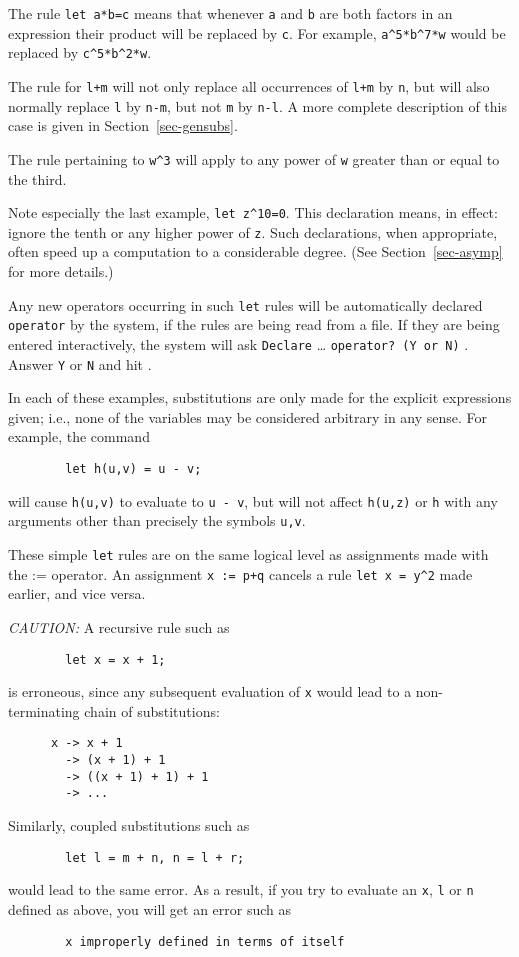 The rule \texttt{let a*b=c} means that whenever \texttt{a} and \texttt{b} are both
factors in an expression their product will be replaced by \texttt{c}.  For
example, \texttt{a\textasciicircum5*b\textasciicircum7*w} would be replaced by
\texttt{c\textasciicircum5*b\textasciicircum2*w}.

The rule for \texttt{l+m} will not only replace all occurrences of \texttt{l+m}
by \texttt{n}, but will also normally replace \texttt{l} by \texttt{n-m}, but not
\texttt{m} by \texttt{n-l}.  A more complete description of this case is given
in Section~\ref{sec-gensubs}.

The rule pertaining to \texttt{w\textasciicircum3} will apply to any power of \texttt{w}
greater than or equal to the third.

Note especially the last example, \texttt{let z\textasciicircum10=0}.  This declaration
means, in effect: ignore the tenth or any higher power of \texttt{z}.  Such
declarations, when appropriate, often speed up a computation to a
considerable degree. (See
Section~\ref{sec-asymp} for more details.)

Any new operators occurring in such \texttt{let} rules will be automatically
declared \texttt{operator} by the system, if the rules are being read from a
file.  If they are being entered interactively, the system will ask
\texttt{Declare} \ldots{} \texttt{operator? (Y or N)} .  Answer \texttt{Y} or \texttt{N} and hit
.

In each of these examples, substitutions are only made for the explicit
expressions given; i.e., none of the variables may be considered arbitrary
in any sense. For example, the command
\begin{verbatim}
        let h(u,v) = u - v;
\end{verbatim}
will cause \texttt{h(u,v)} to evaluate to \texttt{u - v}, but will not affect
\texttt{h(u,z)} or \texttt{h} with any arguments other than precisely the
symbols \texttt{u,v}.

These simple \texttt{let} rules are on the same logical level as assignments
made with the := operator.  An assignment \texttt{x := p+q} cancels a rule
\texttt{let x = y\textasciicircum2} made earlier, and vice versa.

\textit{CAUTION:} A recursive rule such as
\begin{verbatim}
        let x = x + 1;
\end{verbatim}
is erroneous, since any subsequent evaluation of \texttt{x} would lead to a
non-terminating chain of substitutions:
\begin{verbatim}
      x -> x + 1
        -> (x + 1) + 1
        -> ((x + 1) + 1) + 1
        -> ...
\end{verbatim}
Similarly, coupled substitutions such as
\begin{verbatim}
        let l = m + n, n = l + r;
\end{verbatim}
would lead to the same error. As a result, if you try to evaluate an \texttt{x},
\texttt{l} or \texttt{n} defined as above, you will get an error such as
\begin{verbatim}
        x improperly defined in terms of itself
\end{verbatim}

